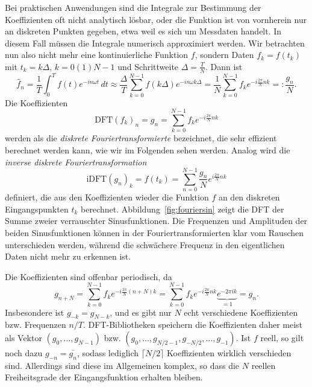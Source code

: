 Bei praktischen Anwendungen sind die Integrale zur Bestimmung der
Koeffizienten oft nicht analytisch lösbar, oder die Funktion ist von
vornherein nur an diskreten Punkten gegeben, etwa weil es sich um
Messdaten handelt. In diesem Fall müssen die Integrale numerisch
approximiert werden. Wir betrachten nun also nicht mehr eine
kontinuierliche Funktion $f$, sondern Daten $f_k = f(t_k)$ mit
$t_k=k\Delta$, $k=0(1)N-1$ und Schrittweite $\Delta =
\frac{T}{N}$. Dann ist
\begin{equation}
  \hat{f}_n = \frac{1}{T}\int_0^T f(t)e^{-i n\omega t}\, dt
  \approx
  \frac{\Delta}{T}\sum_{k=0}^{N-1} f(k\Delta) e^{-i n\omega k\Delta}
  =
  \frac{1}{N}\sum_{k=0}^{N-1} f_k e^{-i\frac{2\pi}{N} n k} =: \frac{g_n}{N}.
\end{equation}
Die Koeffizienten
\begin{equation}
  \label{eq:dft}
  \text{DFT}(f_k)_n = g_n = \sum_{k=0}^{N-1} f_k e^{-i \frac{2\pi}{N} n k}
\end{equation}
werden als die \emph{diskrete Fouriertransformierte} bezeichnet, die
sehr effizient berechnet werden kann, wie wir im Folgenden sehen
werden. Analog wird die \emph{inverse diskrete Fouriertransformation}
\begin{equation}
  \label{eq:idft}
  \text{iDFT}(g_n)_k = f(t_k) = \sum_{n=0}^{N-1} \frac{g_n}{N} e^{i \frac{2\pi}{N} n k}
\end{equation}
definiert, die aus den Koeffizienten wieder die Funktion $f$ an den
diskreten Eingangspunkten $t_k$
berechnet. Abbildung~\ref{fig:fouriersin} zeigt die DFT der Summe
zweier verrauschter Sinusfunktionen. Die Frequenzen und Amplituden der
beiden Sinusfunktionen können in der Fouriertransformierten klar vom
Rauschen unterschieden werden, während die schwächere Frequenz in den
eigentlichen Daten nicht mehr zu erkennen ist.

Die Koeffizienten sind offenbar periodisch, da
\begin{equation}
  \label{eq:dftper}
  g_{n+N} = \sum_{k=0}^{N-1} f_k e^{-i\frac{2\pi}{N} (n + N) k} =
  \sum_{k=0}^{N-1} f_k e^{-i\frac{2\pi}{N} n k} \underbrace{e^{-2\pi i k}}_{=1} = g_n.
\end{equation}
Insbesondere ist $g_{-k} = g_{N-k}$, und es gibt nur $N$ echt
verschiedene Koeffizienten bzw. Frequenzen $n/T$. DFT-Bibliotheken
speichern die Koeffizienten daher meist als Vektor
$(g_{0},\ldots,g_{N-1})$
bzw. $(g_{0},\ldots,g_{N/2-1},g_{-N/2},\ldots,g_{-1})$.  Ist $f$
reell, so gilt noch dazu $g_{-n} = \overline{g_{n}}$, sodass lediglich
$\lceil N/2\rceil$ Koeffizienten wirklich verschieden sind. Allerdings
sind diese im Allgemeinen komplex, so dass die $N$ reellen
Freiheitsgrade der Eingangsfunktion erhalten bleiben.

